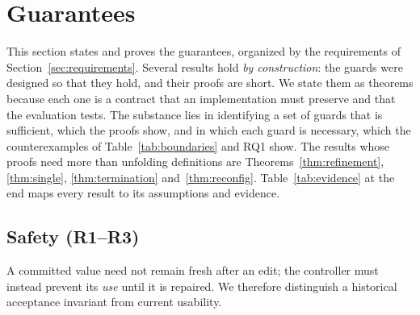 \section{Guarantees}\label{sec:guarantees}
This section states and proves the guarantees, organized by the requirements of Section~\ref{sec:requirements}. Several results hold \emph{by construction}: the guards were designed so that they hold, and their proofs are short. We state them as theorems because each one is a contract that an implementation must preserve and that the evaluation tests. The substance lies in identifying a set of guards that is sufficient, which the proofs show, and in which each guard is necessary, which the counterexamples of Table~\ref{tab:boundaries} and RQ1 show. The results whose proofs need more than unfolding definitions are Theorems~\ref{thm:refinement}, \ref{thm:single}, \ref{thm:termination} and~\ref{thm:reconfig}. Table~\ref{tab:evidence} at the end maps every result to its assumptions and evidence.

\subsection{Safety (R1--R3)}
A committed value need not remain fresh after an edit; the controller must instead prevent its \emph{use} until it is repaired. We therefore distinguish a historical acceptance invariant from current usability.

